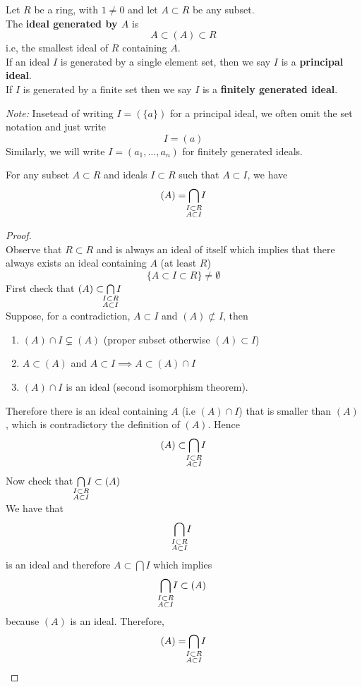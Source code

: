 \documentclass[../Main.tex]{subfiles}
\begin{document}
\begin{dfn}[title = {Ideal Generation, Principal and Finitely Generated Ideal}]
	Let $R$ be a ring, with $1\ne 0$ and let $A\subset R$ be any subset.\\
	The \textbf{ideal generated by $A$} is
	\[A\subset (A)\subset R\]
	i.e, the smallest ideal of $R$ containing $A$.\\
	If an ideal $I$ is generated by a single element set, then we say $I$ is a \textbf{principal ideal}.\\
	If $I$ is generated by a finite set then we say $I$ is a \textbf{finitely generated ideal}.
\end{dfn}
\textit{Note:} Insetead of writing $I=(\{a\})$ for a principal ideal, we often omit the set notation and just write
\[I=(a)\]
Similarly, we will write $I=(a_1,\dots, a_n)$ for finitely generated ideals.
\newpage 
\begin{prop}
	For any subset $A \subset R$ and ideals $I\subset R$ such that $A\subset I$, we have
	\[(A)= \bigcap_{\mathclap{\substack{I \subset R\\A\subset I} } } I\]
\end{prop}
\begin{proof}~\\
	Observe that $R\subset R$ and is always an ideal of itself which implies that there always exists an ideal containing $A$ (at least $R$)
	\[\{A\subset I\subset R\} \ne \emptyset\]
	First check that $(A)\subset \bigcap\limits_{\mathclap{\substack{I \subset R \\A\subset I} } } I$\\
	Suppose, for a contradiction, $A\subset I$ and $(A) \not\subset I$, then
	\begin{enumerate}
		\item $(A) \cap I \subsetneq (A)$ (proper subset otherwise $(A)\subset I$)
		\item $A\subset (A)$ and $A\subset I \implies A\subset (A)\cap I$
		\item $(A) \cap I$ is an ideal (second isomorphism theorem).
	\end{enumerate}
	Therefore there is an ideal containing $A$ (i.e $(A) \cap I$) that is smaller than $(A)$, which is contradictory the definition of $(A)$. Hence\[(A)\subset \bigcap\limits_{\mathclap{\substack{I \subset R \\A\subset I} } } I\] 
	Now check that $\bigcap\limits_{\mathclap{\substack{I \subset R \\A\subset I} } } I\subset (A) $\\
	We have that
	\[\bigcap_{\mathclap{\substack{I \subset R\\A\subset I} } } I\] is an ideal and therefore $A\subset \bigcap I$ which implies
	\[\bigcap_{\mathclap{\substack{I \subset R \\A\subset I} } } I\subset (A) \]
	because $(A)$ is an ideal.
	Therefore,
		\[(A)= \bigcap_{\mathclap{\substack{I \subset R\\A\subset I} } } I\]
\end{proof}
\end{document}
